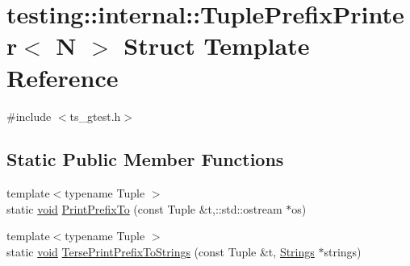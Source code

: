 \hypertarget{structtesting_1_1internal_1_1TuplePrefixPrinter}{\section{testing\-:\-:internal\-:\-:Tuple\-Prefix\-Printer$<$ N $>$ Struct Template Reference}
\label{structtesting_1_1internal_1_1TuplePrefixPrinter}
}


{\ttfamily \#include $<$ts\-\_\-gtest.\-h$>$}

\subsection*{Static Public Member Functions}
\begin{DoxyCompactItemize}
\item 
{\footnotesize template$<$typename Tuple $>$ }\\static \hyperlink{legacy_8hpp_a8bb47f092d473522721002c86c13b94e}{void} \hyperlink{structtesting_1_1internal_1_1TuplePrefixPrinter_ac8ea4f0f2604937a1e40370ef83d9d1b}{Print\-Prefix\-To} (const Tuple \&t,\-::std\-::ostream $\ast$os)
\item 
{\footnotesize template$<$typename Tuple $>$ }\\static \hyperlink{legacy_8hpp_a8bb47f092d473522721002c86c13b94e}{void} \hyperlink{structtesting_1_1internal_1_1TuplePrefixPrinter_afc57456f5cc2a08c11da53094c49dae1}{Terse\-Print\-Prefix\-To\-Strings} (const Tuple \&t, \hyperlink{namespacetesting_1_1internal_a7706b17f05f4b49e351b052ae4e05073}{Strings} $\ast$strings)
\end{DoxyCompactItemize}


